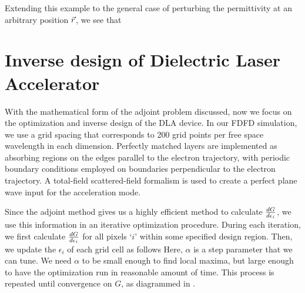 Extending this example to the general case of perturbing the permittivity at an arbitrary position $\vec{r}$, we see that


\section{Inverse design of Dielectric Laser Accelerator}

With the mathematical form of the adjoint problem discussed, now we focus on the optimization and inverse design of the DLA device.
In our FDFD simulation, we use a grid spacing that corresponds to 200 grid points per free space wavelength in each dimension.
Perfectly matched layers are implemented as absorbing regions on the edges parallel to the electron trajectory, with periodic boundary conditions employed on boundaries perpendicular to the electron trajectory.
A total-field scattered-field \cite{taflove2000computational} formalism is used to create a perfect plane wave input for the acceleration mode.

Since the adjoint method gives us a highly efficient method to calculate $\frac{d G}{d \epsilon_{i}}$, we use this information in an iterative optimization procedure.
During each iteration, we first calculate $\frac{d G}{d \epsilon_{i}}$ for all pixels `$i$' within some specified design region.
Then, we update the $\epsilon_i$ of each grid cell as follows
%
%
Here, $\alpha$ is a step parameter that we can tune.
We need $\alpha$ to be small enough to find local maxima, but large enough to have the optimization run in reasonable amount of time.
This process is repeated until convergence on $G$, as diagrammed in .


